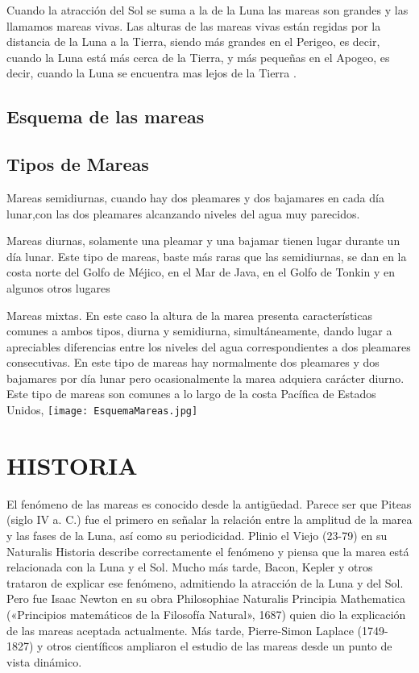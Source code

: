 \documentclass[letterpaper,10pt,twoside,onecolumn]{article}
\begin{document}
Cuando la atracción del Sol se suma a la de la Luna las mareas son grandes y las llamamos mareas vivas. Las alturas de las mareas vivas están regidas por la distancia de la Luna a la Tierra, siendo más grandes en el Perigeo, es decir, cuando la Luna está más cerca de la Tierra, y más pequeñas en el Apogeo, es decir, cuando la Luna se encuentra mas lejos de la Tierra .
\subsection{Esquema de las mareas}
\subsection{Tipos de Mareas}
 Mareas semidiurnas, cuando hay dos pleamares y dos bajamares en cada día lunar,con las dos pleamares alcanzando niveles del agua muy parecidos.

 Mareas diurnas, solamente una pleamar y una bajamar tienen lugar durante un
día lunar. Este tipo de mareas, baste más raras que las semidiurnas, se dan en la costa
norte del Golfo de Méjico, en el Mar de Java, en el Golfo de Tonkin y en algunos otros
lugares

Mareas mixtas. En este caso la altura de la marea presenta características comunes
a ambos tipos, diurna y semidiurna, simultáneamente, dando lugar a apreciables
diferencias entre los niveles del agua correspondientes a dos pleamares consecutivas.
En este tipo de mareas hay normalmente dos pleamares y dos bajamares por día
lunar pero ocasionalmente la marea adquiera carácter diurno. Este tipo de mareas son
comunes a lo largo de la costa Pacífica de Estados Unidos,
\texttt{[image: EsquemaMareas.jpg]}

\section{HISTORIA}
El fenómeno de las mareas es conocido desde la antigüedad. Parece ser que Piteas (siglo IV a. C.) fue el primero en señalar la relación entre la amplitud de la marea y las fases de la Luna, así como su periodicidad. Plinio el Viejo (23-79) en su Naturalis Historia describe correctamente el fenómeno y piensa que la marea está relacionada con la Luna y el Sol. Mucho más tarde, Bacon, Kepler y otros trataron de explicar ese fenómeno, admitiendo la atracción de la Luna y del Sol. Pero fue Isaac Newton en su obra Philosophiae Naturalis Principia Mathematica («Principios matemáticos de la Filosofía Natural», 1687) quien dio la explicación de las mareas aceptada actualmente. Más tarde, Pierre-Simon Laplace (1749-1827) y otros científicos ampliaron el estudio de las mareas desde un punto de vista dinámico.
\end{document}
